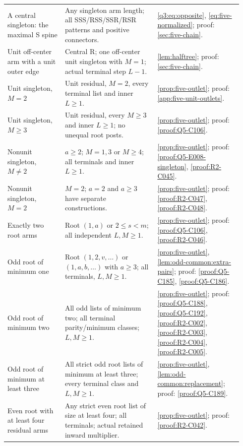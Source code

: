 \begin{longtable}{@{}p{0.23\linewidth}p{0.37\linewidth}p{0.34\linewidth}@{}}
\addlinespace[2pt]
A central singleton: the maximal S spine & Any singleton arm length; all SSS/RSS/SSR/RSR patterns and positive connectors. & \eqref{q3:eq:opposite}, \eqref{eq:five-normalized}; proof: \ref{sec:five-chain}. \\
\addlinespace[2pt]
Unit off-center arm with a unit outer edge & Central R; one off-center unit singleton with $M=1$; actual terminal step $L-1$. & \ref{lem:halftree}; proof: \ref{sec:five-chain}. \\
\addlinespace[2pt]
Unit singleton, $M=2$ & Unit residual, $M=2$, every terminal list and inner $L\ge1$. & \ref{prop:five-outlet}; proof: \ref{app:five-unit-outlets}. \\
\addlinespace[2pt]
Unit singleton, $M\ge3$ & Unit residual, every $M\ge3$ and inner $L\ge1$; no unequal root posts. & \ref{prop:five-outlet}; proof: \ref{proof:Q5-C106}. \\
\addlinespace[2pt]
Nonunit singleton, $M\ne2$ & $a\ge2$; $M=1,3$ or $M\ge4$; all terminals and inner $L\ge1$. & \ref{prop:five-outlet}; proof: \ref{proof:Q5-E008-singleton}, \ref{proof:R2-C045}. \\
\addlinespace[2pt]
Nonunit singleton, $M=2$ & $M=2$; $a=2$ and $a\ge3$ have separate constructions. & \ref{prop:five-outlet}; proof: \ref{proof:R2-C047}, \ref{proof:R2-C048}. \\
\addlinespace[2pt]
Exactly two root arms & Root $(1,a)$ or $2\le s<m$; all independent $L,M\ge1$. & \ref{prop:five-outlet}; proof: \ref{proof:Q5-C106}, \ref{proof:R2-C046}. \\
\addlinespace[2pt]
Odd root of minimum one & Root $(1,2,v,\ldots)$ or $(1,a,b,\ldots)$ with $a\ge3$; all terminals, $L,M\ge1$. & \ref{prop:five-outlet}, \ref{lem:odd-common:extra-pairs}; proof: \ref{proof:Q5-C185}, \ref{proof:Q5-C186}. \\
\addlinespace[2pt]
Odd root of minimum two & All odd lists of minimum two; all terminal parity/minimum classes; $L,M\ge1$. & \ref{prop:five-outlet}; proof: \ref{proof:Q5-C188}, \ref{proof:Q5-C192}, \ref{proof:R2-C002}, \ref{proof:R2-C003}, \ref{proof:R2-C004}, \ref{proof:R2-C005}. \\
\addlinespace[2pt]
Odd root of minimum at least three & All strict odd root lists of minimum at least three; every terminal class and $L,M\ge1$. & \ref{prop:five-outlet}, \ref{lem:odd-common:replacement}; proof: \ref{proof:Q5-C189}. \\
\addlinespace[2pt]
Even root with at least four residual arms & Any strict even root list of size at least four; all terminals; actual retained inward multiplier. & \ref{prop:five-outlet}; proof: \ref{proof:R2-C042}. \\

\end{longtable}
